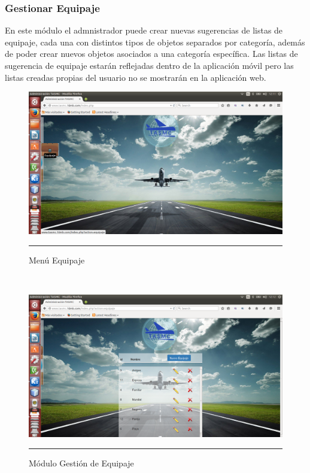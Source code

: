\subsubsection{Gestionar Equipaje}
En este módulo el admnistrador puede crear nuevas sugerencias de listas de equipaje, cada una con distintos tipos de objetos separados 
por categoría, además de poder crear nuevos objetos asociados a una categoría específica. Las listas de sugerencia de equipaje estarán 
reflejadas dentro de la aplicación móvil pero las listas creadas propias del usuario no se mostrarán en la aplicación web.
\begin{figure}[h!]
	\centering
		\includegraphics[width=1\textwidth]{Figuras/indexEquipaje.png}
		\rule{35em}{0.5pt}
	\caption[Menú Equipaje]{Menú Equipaje}
	\label{fig:menuEquipaje}
\end{figure}
\\
\begin{figure}[h!]
	\centering
		\includegraphics[width=1\textwidth]{Figuras/equipajes.png}
		\rule{35em}{0.5pt}
	\caption[Módulo Gestión de Equipaje]{Módulo Gestión de Equipaje}
	\label{fig:moduloEquipaje}
\end{figure}
